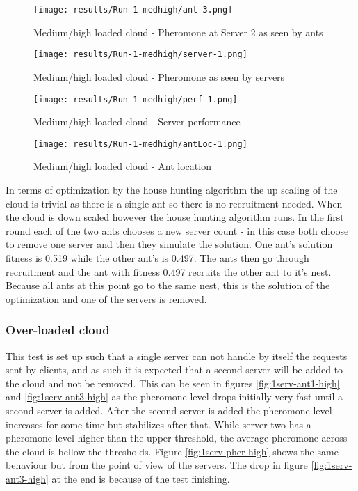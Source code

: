 \begin{figure}
	\centering
		\texttt{[image: results/Run-1-medhigh/ant-3.png]}
	\caption{Medium/high loaded cloud - Pheromone at Server 2 as seen by ants}
	\label{fig:1serv-ant3-medhigh}
\end{figure}

\begin{figure}
	\centering
		\texttt{[image: results/Run-1-medhigh/server-1.png]}
	\caption{Medium/high loaded cloud - Pheromone as seen by servers}
	\label{fig:1serv-pher-medhigh}
\end{figure}

\begin{figure}
	\centering
		\texttt{[image: results/Run-1-medhigh/perf-1.png]}
	\caption{Medium/high loaded cloud - Server performance}
	\label{fig:1serv-perf-medhigh}
\end{figure}

\begin{figure}
	\centering
		\texttt{[image: results/Run-1-medhigh/antLoc-1.png]}
	\caption{Medium/high loaded cloud - Ant location}
	\label{fig:1serv-antloc-medhigh}
\end{figure}

In terms of optimization by the house hunting algorithm the up scaling of the cloud is trivial as there is a single ant so there is no recruitment needed. When the cloud is down scaled however the house hunting algorithm runs. In the first round each of the two ants chooses a new server count - in this case both choose to remove one server and then they simulate the solution. One ant's solution fitness is 0.519 while the other ant's is 0.497. The ants then go through recruitment and the ant with fitness 0.497 recruits the other ant to it's nest. Because all ants at this point go to the same nest, this is the solution of the optimization and one of the servers is removed.

\subsubsection{Over-loaded cloud}

This test is set up such that a single server can not handle by itself the requests sent by clients, and as such it is expected that a second server will be added to the cloud and not be removed. This can be seen in figures \ref{fig:1serv-ant1-high} and \ref{fig:1serv-ant3-high} as the pheromone level drops initially very fast until a second server is added. After the second server is added the pheromone level increases for some time but stabilizes after that. While server two has a pheromone level higher than the upper threshold, the average pheromone across the cloud is bellow the thresholds. Figure \ref{fig:1serv-pher-high} shows the same behaviour but from the point of view of the servers. The drop in figure \ref{fig:1serv-ant3-high} at the end is because of the test finishing.

